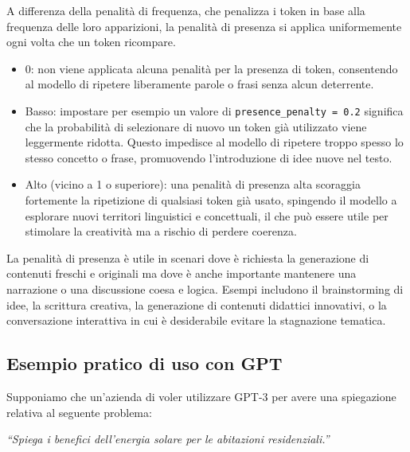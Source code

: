             A differenza della penalità di frequenza, che penalizza i token in base alla frequenza delle loro apparizioni, la penalità di presenza si applica uniformemente ogni volta che un token ricompare.
            \begin{itemize}
                \item 0: non viene applicata alcuna penalità per la presenza di token, consentendo al modello di ripetere liberamente parole o frasi senza alcun deterrente.
            
                \item Basso: impostare per esempio un valore di \texttt{presence\_penalty = 0.2} significa che la probabilità di selezionare di nuovo un token già utilizzato viene leggermente ridotta. Questo impedisce al modello di ripetere troppo spesso lo stesso concetto o frase, promuovendo l'introduzione di idee nuove nel testo.
            
                \item Alto (vicino a 1 o superiore): una penalità di presenza alta scoraggia fortemente la ripetizione di qualsiasi token già usato, spingendo il modello a esplorare nuovi territori linguistici e concettuali, il che può essere utile per stimolare la creatività ma a rischio di perdere coerenza.
            \end{itemize}
            
            La penalità di presenza è utile in scenari dove è richiesta la generazione di contenuti freschi e originali ma dove è anche importante mantenere una narrazione o una discussione coesa e logica. Esempi includono il brainstorming di idee, la scrittura creativa, la generazione di contenuti didattici innovativi, o la conversazione interattiva in cui è desiderabile evitare la stagnazione tematica.
            
    \subsection{Esempio pratico di uso con GPT}
        Supponiamo che un'azienda di voler utilizzare GPT-3 per avere una spiegazione relativa al seguente problema:

        \begin{center}
            \textit{``Spiega i benefici dell'energia solare per le abitazioni residenziali.''}
        \end{center}

